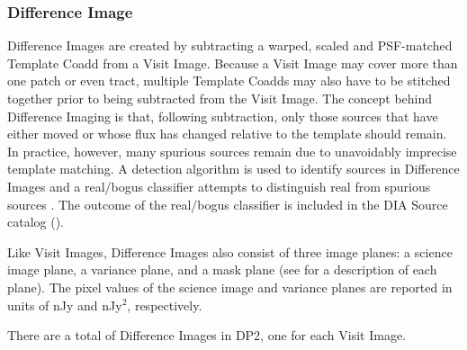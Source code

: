 \subsubsection{Difference Image}
\label{sssec:difference_image}
Difference Images are created by subtracting a warped, scaled and PSF-matched Template Coadd from a Visit Image.
Because a Visit Image may cover more than one patch or even tract, multiple Template Coadds may also have to be stitched together prior to being subtracted from the Visit Image.
The concept behind Difference Imaging is that, following subtraction, only those sources that have either moved or whose flux has changed relative to the template should remain.
In practice, however, many spurious sources remain due to unavoidably imprecise template matching.
A detection algorithm is used to identify sources in Difference Images and a real/bogus classifier attempts to distinguish real from spurious sources \citep[][]{DMTN-337}.
The outcome of the real/bogus classifier is included in the DIA Source catalog ().

Like Visit Images, Difference Images also consist of three image planes: a science image plane, a variance plane, and a mask plane (see  for a description of each plane).
The pixel values of the science image and variance planes are reported in units of nJy and nJy$^2$, respectively.

There are a total of \ndifferenceimages Difference Images in DP2, one for each Visit Image.



